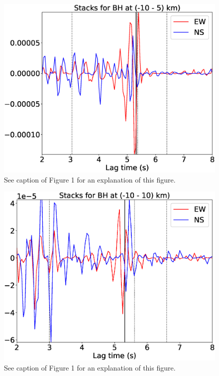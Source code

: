 \documentclass[letterpaper, 12pt]{article}
\begin{document}
\begin{figure}[H]
\includegraphics[width=\linewidth]{figures/intervals/BH_-10_005_stacks.eps}
\caption{See caption of Figure 1 for an explanation of this figure.}
\end{figure}

\begin{figure}[H]
\includegraphics[width=\linewidth]{figures/intervals/BH_-10_010_stacks.eps}
\caption{See caption of Figure 1 for an explanation of this figure.}
\end{figure}
\end{document}
